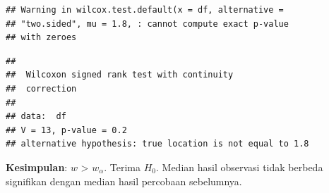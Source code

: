 \documentclass[]{book}
\begin{document}
\begin{verbatim}
## Warning in wilcox.test.default(x = df, alternative =
## "two.sided", mu = 1.8, : cannot compute exact p-value
## with zeroes
\end{verbatim}

\begin{verbatim}
## 
##  Wilcoxon signed rank test with continuity
##  correction
## 
## data:  df
## V = 13, p-value = 0.2
## alternative hypothesis: true location is not equal to 1.8
\end{verbatim}

\textbf{Kesimpulan}: \(w\) \textgreater{} \(w_\alpha\). Terima \(H_0\).
Median hasil observasi tidak berbeda signifikan dengan median hasil
percobaan sebelumnya.


\end{document}
